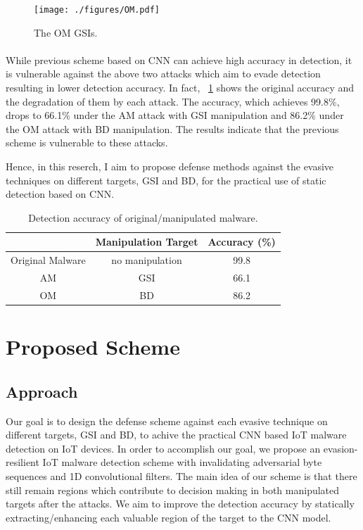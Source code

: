 \documentclass{ieeeaccess}
\begin{document}
\begin{figure}[h]
 \centering
 \texttt{[image: ./figures/OM.pdf]}
 \caption{The OM GSIs.} 
 \label{fig:omGSI}
\end{figure}

\paragraph*{}
While previous scheme based on CNN can achieve high accuracy in detection, it is vulnerable against the above two attacks which aim to evade detection resulting in lower detection accuracy.
In fact, \tablename~\ref{tab:prev} shows the original accuracy and the degradation of them by each attack.
The accuracy, which achieves 99.8\%, drops to 66.1\% under the AM attack with GSI manipulation and 86.2\% under the OM attack with BD manipulation.
The results indicate that the previous scheme is vulnerable to these attacks.

Hence, in this reserch, I aim to propose defense methods against the evasive techniques on different targets, GSI and BD, for the practical use of static detection based on CNN.

\begin{table}[h]
  \begin{center}
    \caption{Detection accuracy of original/manipulated malware.}
    \label{tab:prev} 
    \begin{tabular}{|c|c|c|} \hline
       & Manipulation Target & Accuracy (\%) \\ \hline \hline
      Original Malware & no manipulation  & 99.8  \\ \hline
      AM & GSI & 66.1  \\ \hline 
      OM & BD & 86.2 \\ \hline
    \end{tabular}
  \end{center}
\end{table} 

\section{Proposed Scheme} \label{sec:proposed_scheme}
\subsection{Approach}
Our goal is to design the defense scheme against each evasive technique on different targets, GSI and BD, to achive the practical CNN based IoT malware detection on IoT devices.
In order to accomplish our goal, we propose an evasion-resilient IoT malware detection scheme with invalidating adversarial byte sequences and 1D convolutional filters.  
The main idea of our scheme is that there still remain regions which contribute to decision making in both manipulated targets after the attacks.
We aim to improve the detection accuracy by statically extracting/enhancing each valuable region of the target to the CNN model.
\end{document}

